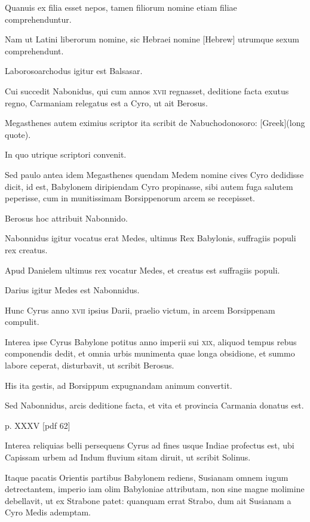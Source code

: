 \begin{parnumbers}
Quanuis ex filia esset nepos, tamen filiorum nomine etiam filiae
 comprehenduntur.

Nam ut Latini liberorum nomine, sic Hebraei nomine
\texthebrew{[Hebrew]} utrumque sexum comprehendunt.

Laborosoarchodus igitur
est Balsasar.

Cui succedit Nabonidus, qui cum annos \textsc{xvii} regnasset,
deditione facta exutus regno, Carmaniam relegatus est a Cyro,
ut ait Berosus.

Megasthenes autem eximius scriptor ita scribit de
Nabuchodonosoro: \textgreek{[Greek](long quote)}.

In
quo utrique scriptori convenit.

Sed paulo antea idem Megasthenes
quendam Medem nomine cives Cyro dedidisse dicit, id est, Babylonem
diripiendam Cyro propinasse, sibi autem fuga salutem peperisse,
cum in munitissimam Borsippenorum arcem se recepisset.

Berosus hoc attribuit Nabonnido.

Nabonnidus igitur vocatus erat
Medes, ultimus Rex Babylonis, suffragiis populi rex creatus.

Apud
Danielem ultimus rex vocatur Medes, et creatus est suffragiis populi.

Darius igitur Medes est Nabonnidus.

Hunc Cyrus anno \textsc{xvii}
ipsius Darii, praelio victum, in arcem Borsippenam compulit.

Interea ipse Cyrus Babylone potitus anno imperii sui \textsc{xix}, aliquod
tempus rebus componendis dedit, et omnia urbis munimenta
quae longa obsidione, et summo labore ceperat, disturbavit, ut
scribit Berosus.

His ita gestis, ad Borsippum expugnandam animum
convertit.

Sed Nabonnidus, arcis deditione facta, et vita
et provincia Carmania donatus est.

\clearpage
p. XXXV [pdf 62]

Interea reliquias belli persequens
Cyrus ad fines usque Indiae profectus est, ubi Capissam urbem
ad Indum fluvium sitam diruit, ut scribit Solinus.

Itaque pacatis Orientis partibus Babylonem rediens, Susianam omnem iugum
detrectantem, imperio iam olim Babyloniae attributam, non
sine magne molimine debellavit, ut ex Strabone patet: quanquam
errat Strabo, dum ait Susianam a Cyro Medis ademptam.


\end{parnumbers}
